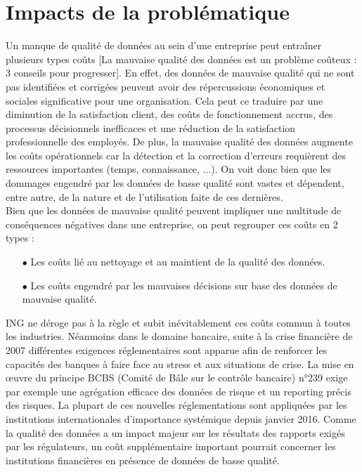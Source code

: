 \documentclass[a4paper, 12pt, french]{article}
\begin{document}
\section{Impacts de la problématique}

Un manque de qualité de données au sein d'une entreprise peut entraîner plusieurs types coûts [La mauvaise qualité des données est un problème coûteux : 3 conseils pour progresser]. En effet, des données de mauvaise qualité qui ne sont pas identifiées et corrigées peuvent avoir des répercussions économiques et sociales significative pour une organisation. Cela peut ce traduire par une diminution de la satisfaction client, des coûts de fonctionnement accrus, des processus décisionnels inefficaces et une réduction de la satisfaction professionnelle des employés. De plus, la mauvaise qualité des données augmente les coûts opérationnels car la détection et la correction d'erreurs requièrent des ressources importantes (temps, connaissance, ...). On voit donc bien que les dommages engendré par les données de basse qualité sont vastes et dépendent, entre autre, de la nature et de l'utilisation faite de ces dernières. \\

Bien que les données de mauvaise qualité peuvent impliquer une multitude de conséquences négatives dans une entreprise, on peut regrouper ces coûts en 2 types : 

\vspace{0.25cm}
\begin{itemize}
\item[$\bullet$] Les coûts lié au nettoyage et au maintient de la qualité des données.
\item[$\bullet$] Les coûts engendré par les mauvaises décisions sur base des données de mauvaise qualité. 
\end{itemize}
\vspace{0.5cm}

ING ne déroge pas à la règle et subit inévitablement ces coûts commun à toutes les industries. Néanmoins dans le domaine bancaire, suite à la crise financière de 2007 différentes exigences réglementaires sont apparue afin de renforcer les capacités des banques à faire face au stress et aux situations de crise. La mise en œuvre du principe BCBS (Comité de Bâle sur le contrôle bancaire) n°239 exige par exemple une agrégation efficace des données de risque et un reporting précis des risques. La plupart de ces nouvelles réglementations sont appliquées par les institutions internationales d'importance systémique depuis janvier 2016. Comme la qualité des données a un impact majeur sur les résultats des rapports exigés par les régulateurs, un coût supplémentaire important pourrait concerner les institutions financières en présence de données de basse qualité. \\
\end{document}
